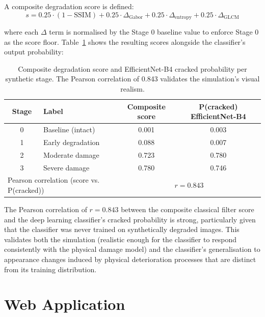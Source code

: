 \documentclass[12pt,a4paper]{article}
\begin{document}
A composite degradation score is defined:
\begin{equation}
s = 0.25 \cdot (1 - \text{SSIM}) + 0.25 \cdot \Delta_\text{Gabor} + 0.25 \cdot \Delta_\text{entropy} + 0.25 \cdot \Delta_\text{GLCM}
\end{equation}

where each $\Delta$ term is normalised by the Stage 0 baseline value to enforce Stage 0 as the score floor. Table~\ref{tab:deg_score} shows the resulting scores alongside the classifier's output probability:

\begin{table}[H]
\centering
\caption{Composite degradation score and EfficientNet-B4 cracked probability per synthetic stage. The Pearson correlation of 0.843 validates the simulation's visual realism.}
\label{tab:deg_score}
\begin{tabular}{clcc}
\toprule
\rowcolor{white}
\textbf{Stage} & \textbf{Label} & \textbf{Composite score} & \textbf{P(cracked) EfficientNet-B4} \\
\midrule
0 & Baseline (intact) & 0.001 & 0.003 \\
1 & Early degradation & 0.088 & 0.007 \\
2 & Moderate damage & 0.723 & 0.780 \\
3 & Severe damage & 0.780 & 0.746 \\
\midrule
\multicolumn{2}{l}{Pearson correlation (score vs. P(cracked))} & \multicolumn{2}{c}{$r = 0.843$} \\
\bottomrule
\end{tabular}
\end{table}

The Pearson correlation of $r = 0.843$ between the composite classical filter score and the deep learning classifier's cracked probability is strong, particularly given that the classifier was never trained on synthetically degraded images. This validates both the simulation (realistic enough for the classifier to respond consistently with the physical damage model) and the classifier's generalisation to appearance changes induced by physical deterioration processes that are distinct from its training distribution.

\clearpage
\section{Web Application}
\end{document}
